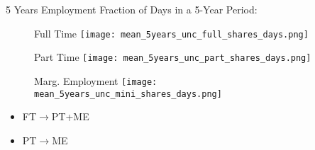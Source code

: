 \documentclass[hyperref={bookmarks=false}]{beamer}
\begin{document}
\begin{appendix}

\begin{frame}{5 Years Employment}
Fraction of Days in a 5-Year Period:
\begin{figure}[!t]
\begin{minipage}[b]{0.32\textwidth}{Full Time}
\centering
\texttt{[image: mean\_5years\_unc\_full\_shares\_days.png]}
\end{minipage}
\begin{minipage}[b]{0.32\textwidth}{Part Time}
\centering
\texttt{[image: mean\_5years\_unc\_part\_shares\_days.png]}
\end{minipage}
\begin{minipage}[b]{0.32\textwidth}{Marg. Employment}
\centering
\texttt{[image: mean\_5years\_unc\_mini\_shares\_days.png]}
\end{minipage}
\end{figure}
\begin{itemize}
\item FT$\rightarrow$PT+ME
\item PT$\rightarrow$ME
\end{itemize}
\end{frame}



\end{appendix}
\end{document}
